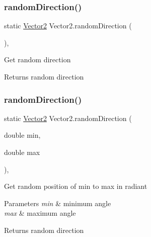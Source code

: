 \subsubsection{\texorpdfstring{random\+Direction()}{randomDirection()}\hspace{0.1cm}{\footnotesize\ttfamily [1/2]}}
{\footnotesize\ttfamily static \mbox{\hyperlink{class_vector2}{Vector2}} Vector2.\+random\+Direction (\begin{DoxyParamCaption}{ }\end{DoxyParamCaption})\hspace{0.3cm}{\ttfamily [inline]}, {\ttfamily [static]}}

Get random direction \begin{DoxyReturn}{Returns}
random direction 
\end{DoxyReturn}
\mbox{\label{class_vector2_abf982a5300ee21200b1021e27de420ab}} 
\subsubsection{\texorpdfstring{random\+Direction()}{randomDirection()}\hspace{0.1cm}{\footnotesize\ttfamily [2/2]}}
{\footnotesize\ttfamily static \mbox{\hyperlink{class_vector2}{Vector2}} Vector2.\+random\+Direction (\begin{DoxyParamCaption}\item[{double}]{min,  }\item[{double}]{max }\end{DoxyParamCaption})\hspace{0.3cm}{\ttfamily [inline]}, {\ttfamily [static]}}

Get random position of min to max in radiant 
\begin{DoxyParams}{Parameters}
{\em min} & minimum angle \\
\hline
{\em max} & maximum angle \\
\hline
\end{DoxyParams}
\begin{DoxyReturn}{Returns}
random direction 
\end{DoxyReturn}
\mbox{\label{class_vector2_ac428f5ec5017a6c4a2ec850bcd95fea3}} 
